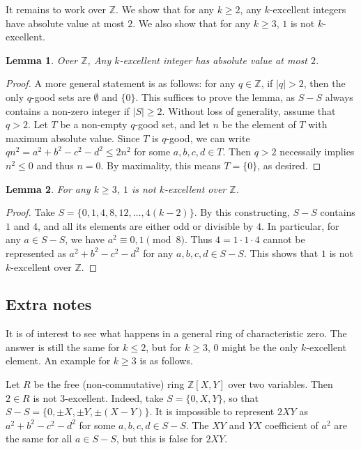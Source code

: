 \documentclass{article}
\newcommand{\Z}{\mathbb{Z}}
\newtheorem{lemma}{Lemma}
\begin{document}
It remains to work over $\Z$.
We show that for any $k \geq 2$, any $k$-excellent integers have absolute value at most $2$.
We also show that for any $k \geq 3$, $1$ is not $k$-excellent.

\begin{lemma}\label{2017a2-5}
Over $\Z$, Any $k$-excellent integer has absolute value at most $2$.
\end{lemma}
\begin{proof}
A more general statement is as follows: for any $q \in \Z$, if $|q| > 2$, then the only $q$-good sets are $\emptyset$ and $\{0\}$.
This suffices to prove the lemma, as $S - S$ always contains a non-zero integer if $|S| \geq 2$.
Without loss of generality, assume that $q > 2$.
Let $T$ be a non-empty $q$-good set, and let $n$ be the element of $T$ with maximum absolute value.
Since $T$ is $q$-good, we can write $qn^2 = a^2 + b^2 - c^2 - d^2 \leq 2n^2$ for some $a, b, c, d \in T$.
Then $q > 2$ necessaily implies $n^2 \leq 0$ and thus $n = 0$.
By maximality, this means $T = \{0\}$, as desired.
\end{proof}

\begin{lemma}\label{2017a2-6}
For any $k \geq 3$, $1$ is not $k$-excellent over $\Z$.
\end{lemma}
\begin{proof}
Take $S = \{0, 1, 4, 8, 12, \ldots, 4(k - 2)\}$.
By this constructing, $S - S$ contains $1$ and $4$, and all its elements are either odd or divisible by $4$.
In particular, for any $a \in S - S$, we have $a^2 \equiv 0, 1 \pmod{8}$.
Thus $4 = 1 \cdot 1 \cdot 4$ cannot be represented as $a^2 + b^2 - c^2 - d^2$ for any $a, b, c, d \in S - S$.
This shows that $1$ is not $k$-excellent over $\Z$.
\end{proof}



\subsection*{Extra notes}

It is of interest to see what happens in a general ring of characteristic zero.
The answer is still the same for $k \leq 2$, but for $k \geq 3$, $0$ might be the only $k$-excellent element.
An example for $k \geq 3$ is as follows.

Let $R$ be the free (non-commutative) ring $\Z[X, Y]$ over two variables.
Then $2 \in R$ is not $3$-excellent.
Indeed, take $S = \{0, X, Y\}$, so that $S - S = \{0, \pm X, \pm Y, \pm (X - Y)\}$.
It is impossible to represent $2XY$ as $a^2 + b^2 - c^2 - d^2$ for some $a, b, c, d \in S - S$.
The $XY$ and $YX$ coefficient of $a^2$ are the same for all $a \in S - S$, but this is false for $2XY$.
\end{document}
